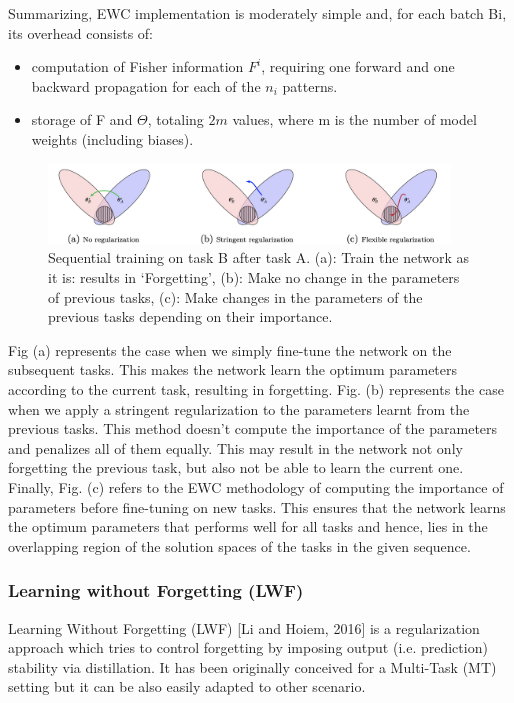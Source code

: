 \documentclass[english, LaM, oneside]{sapthesis}%
\begin{document}
Summarizing, EWC implementation is moderately simple and, for each batch Bi, its overhead consists of:
\begin{itemize}
    \item computation of Fisher information $F^i$, requiring one forward and one backward propagation for each of the $n_i$ patterns.
    \item storage of F and $\Theta$, totaling $2m$ values, where m is the number of model weights (including biases).
   
\end{itemize}
\begin{figure}[!h]
            \centering
            \includegraphics[width=0.95\textwidth]{ewc.png}
            \caption{Sequential training on task B after task A. (a): Train the network as it is: results in ‘Forgetting’, (b): Make no change in the parameters of previous tasks, (c): Make changes in the parameters of the previous tasks depending on their importance.}
            \label{fig:dnn}
        \end{figure}
Fig (a) represents the case when we simply fine-tune the network on the subsequent tasks. This makes the network learn the optimum parameters according to the current task, resulting in forgetting. Fig. (b) represents the case when we apply a stringent regularization to the parameters learnt from the previous tasks. This method doesn’t compute the importance of the parameters and penalizes all of them equally. This may result in the network not only forgetting the previous task, but also not be able to learn the current one. Finally, Fig. (c) refers to the EWC methodology of computing the importance of parameters before fine-tuning on new tasks. This ensures that the network learns the optimum parameters that performs well for all tasks and hence, lies in the overlapping region of the solution spaces of the tasks in the given sequence.
\subsubsection{Learning without Forgetting (LWF)}
Learning Without Forgetting (LWF) [Li and Hoiem, 2016] is a regularization approach which tries to control forgetting by imposing output (i.e. prediction) stability via distillation. It has been originally conceived for a Multi-Task (MT) setting but it can be also easily adapted to other scenario.
\end{document}

